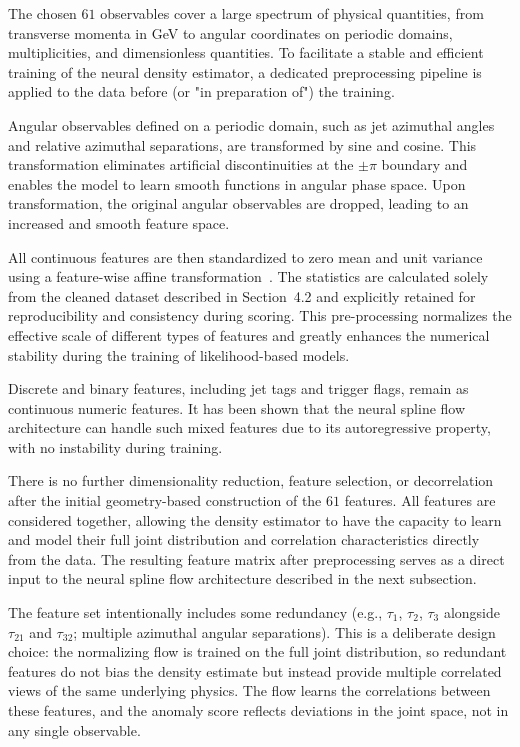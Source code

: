 \documentclass[11pt,a4paper,twocolumn]{article}
\begin{document}
The chosen $61$ observables cover a large spectrum of physical quantities, from transverse momenta in GeV to angular coordinates on periodic domains, multiplicities, and dimensionless quantities. To facilitate a stable and efficient training of the neural density estimator, a dedicated preprocessing pipeline is applied to the data before (or "in preparation of") the training.

Angular observables defined on a periodic domain, such as jet azimuthal angles and relative azimuthal separations, are transformed by sine and cosine. This transformation eliminates artificial discontinuities at the $\pm\pi$ boundary and enables the model to learn smooth functions in angular phase space. Upon transformation, the original angular observables are dropped, leading to an increased and smooth feature space.

All continuous features are then standardized to zero mean and unit variance using a feature-wise affine transformation~\cite{Pedregosa2011ScikitLearn}. The statistics are calculated solely from the cleaned dataset described in Section~4.2 and explicitly retained for reproducibility and consistency during scoring. This pre-processing normalizes the effective scale of different types of features and greatly enhances the numerical stability during the training of likelihood-based models.

Discrete and binary features, including jet tags and trigger flags, remain as continuous numeric features. It has been shown that the neural spline flow architecture can handle such mixed features due to its autoregressive property, with no instability during training.

There is no further dimensionality reduction, feature selection, or decorrelation after the initial geometry-based construction of the $61$ features. All features are considered together, allowing the density estimator to have the capacity to learn and model their full joint distribution and correlation characteristics directly from the data. The resulting feature matrix after preprocessing serves as a direct input to the neural spline flow architecture described in the next subsection.

The feature set intentionally includes some redundancy (e.g., $\tau_1$, $\tau_2$, $\tau_3$ alongside $\tau_{21}$ and $\tau_{32}$; multiple azimuthal angular separations). This is a deliberate design choice: the normalizing flow is trained on the full joint distribution, so redundant features do not bias the density estimate but instead provide multiple correlated views of the same underlying physics. The flow learns the correlations between these features, and the anomaly score reflects deviations in the joint space, not in any single observable.
\end{document}
